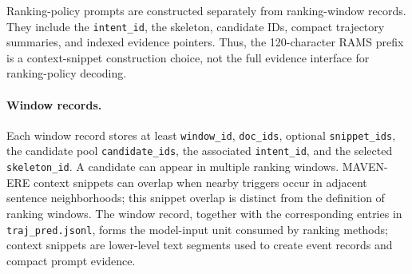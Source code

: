 \documentclass{article}
\begin{document}
Ranking-policy prompts are constructed separately from ranking-window records.
They include the \texttt{intent\_id}, the skeleton, candidate IDs, compact trajectory summaries, and indexed evidence pointers.
Thus, the 120-character RAMS prefix is a context-snippet construction choice, not the full evidence interface for ranking-policy decoding.

\paragraph{Window records.}
Each window record stores at least \texttt{window\_id}, \texttt{doc\_ids}, optional \texttt{snippet\_ids}, the candidate pool \texttt{candidate\_ids}, the associated \texttt{intent\_id}, and the selected \texttt{skeleton\_id}.
A candidate can appear in multiple ranking windows.
MAVEN-ERE context snippets can overlap when nearby triggers occur in adjacent sentence neighborhoods; this snippet overlap is distinct from the definition of ranking windows.
The window record, together with the corresponding entries in \texttt{traj\_pred.jsonl}, forms the model-input unit consumed by ranking methods; context snippets are lower-level text segments used to create event records and compact prompt evidence.
\end{document}
